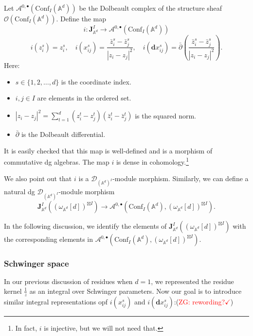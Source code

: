 \documentclass[11pt]{amsart}
\theoremstyle{definition}
\theoremstyle{remark}
\numberwithin{equation}{section}
\newcommand{\Gui}[1]{(\textcolor{red}{ZG: #1})}
\begin{document}
Let $\mathcal{A}^{0,\bullet}(\mathrm{Conf}_{ I}(\mathbb{A}^d))$ be the Dolbeault complex of the structure sheaf $\mathcal{O}(\mathrm{Conf}_{ I}(\mathbb{A}^{d}))$. Define the map
$$
i:\mathbf{J}^{ I}_{\mathbb{A}^{d}}\rightarrow\mathcal{A}^{0,\bullet}(\mathrm{Conf}_{ I}(\mathbb{A}^d))
$$
$$
i(z_{i}^{s}) = z_{i}^{s},\quad i(x_{ij}^{s}) = \frac{\bar{z}_{i}^{s} - \bar{z}_{j}^{s}}{|z_{i} - z_{j}|^{2}},\quad i(\mathbf{d}x_{ij}^{s}) = \bar{\partial}\left(\frac{\bar{z}_{i}^{s} - \bar{z}_{j}^{s}}{|z_{i} - z_{j}|^{2}}\right).
$$
Here:
\begin{itemize}
    \item \(s \in \{1,2,\dots,d\}\) is the coordinate index.
    \item \(i, j \in  I\) are elements in the ordered set.
    \item \(|z_{i} - z_{j}|^{2} = \sum\limits_{t=1}^{d}(z_{i}^{t} - z_{j}^{t})(\bar{z}_{i}^{t} - \bar{z}_{j}^{t})\) is the squared norm.
    \item \(\bar{\partial}\) is the Dolbeault differential.
\end{itemize}
It is easily checked that this map is well-defined and is a morphism of commutative dg algebras.
The map $i$ is dense in cohomology.\footnote{In fact, $i$
is injective, but we will not need that.}

We also point out that $i$ is a $\mathcal{D}_{(\mathbb{A}^{d})^{ I}}$-module morphism.
Similarly, we can define a natural dg $\mathcal{D}_{(\mathbb{A}^{d})^{ I}}$-module
morphism
\[
  \mathbf{J}^{ I}_{\mathbb{A}^{d}}((\omega_{\mathbb{A}^{d}}[d])^{\boxtimes I}) \to \mathcal{A}^{0,\bullet}
  (\mathrm{Conf}_{ I}(\mathbb{A}^d),(\omega_{\mathbb{A}^{d}}[d])^{\boxtimes I}) .
\]

In the following discussion, we identify the elements of $\mathbf{J}^{ I}_{\mathbb{A}^{d}}((\omega_{\mathbb{A}^{d}}[d])^{\boxtimes I})$ with the corresponding elements in $\mathcal{A}^{0,\bullet}(\mathrm{Conf}_{ I}(\mathbb{A}^d),(\omega_{\mathbb{A}^{d}}[d])^{\boxtimes I})$.

\subsubsection{Schwinger space}

In our previous discussion of residues when $d=1$, we represented the residue kernel $\frac{1}{z}$ as an integral over Schwinger parameters.
Now our goal is to introduce similar integral representations opf $i(x_{ij}^{s})$ and $i(\mathbf{d}x_{ij}^{s})$:\Gui{rewording?$\checkmark$}
\end{document}
